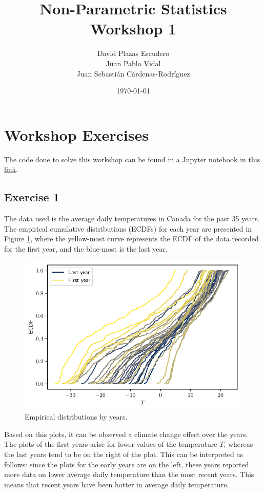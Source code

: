 \documentclass[11pt]{article}
\title{Non-Parametric Statistics Workshop 1}
\author{David Plazas Escudero \\
  Juan Pablo Vidal \\
  Juan Sebasti\'an C\'ardenas-Rodríguez \\
  \scalebox{0.7}{Mathematical Engineering, Universidad EAFIT}}
\date{\today}
\theoremstyle{definition}
\theoremstyle{remark}
\theoremstyle{remark}
\begin{document}
\maketitle
\section{Workshop Exercises}
The code done to solve this workshop can be found in a Jupyter
notebook in this \href{https://bit.ly/2SNMPod}{link}.
\subsection*{Exercise 1}
The data used is the average daily temperatures in Canada for the past
35 years. The empirical cumulative distributions (ECDFs) for each year
are presented in Figure \ref{fig:ecdfs_temps}, where the yellow-most
curve represents the ECDF of the data recorded for the first year, and
the blue-most is the last year.
\begin{figure}[H]
    \centering
    \includegraphics[scale=.5]{../figs/ecdfs.pdf}
    \caption{Empirical distributions by years.}
    \label{fig:ecdfs_temps}
\end{figure}

Based on this plots, it can be observed a climate change effect over
the years. The plots of the first years arise for lower values of the
temperature $T$, whereas the last years tend to be on the right of the
plot. This can be interpreted as follows: since the plots for the
early years are on the left, these years reported more data on lower
average daily temperature than the most recent years. This means that
recent years have been hotter in average daily temperature.
\end{document}
